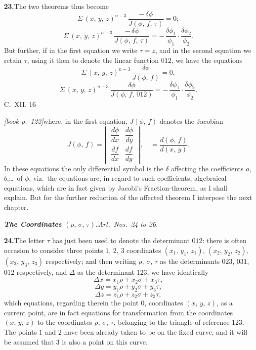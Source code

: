 \documentclass[11pt,a4paper]{article}
\theoremstyle{plain}
\theoremstyle{definition}
\theoremstyle{remark}
\begin{document}
\medskip\noindent\textbf{23.}\quad The two theorems thus become
\[
\Sigma\,(x,\,y,\,z)^{n-3}\,\frac{-\,\delta\phi}{J(\phi,\,f,\,\tau)} = 0;
\]
\[
\Sigma\,(x,\,y,\,z)^{n-3}\,\frac{-\,\delta\phi}{J(\phi,\,f,\,\tau)} = -\,\frac{\delta\phi_1}{\phi_1}\cdot\frac{\delta\phi_2}{\phi_2}.
\]
But further, if in the first equation we write $\tau = z$, and in the second equation we retain $\tau$, using it then to denote the linear function $012$, we have the equations
\[
\Sigma\,(x,\,y,\,z)^{n-3}\,\frac{\delta\phi}{J(\phi,\,f)} = 0,
\]
\[
\Sigma\,(x,\,y,\,z)^{n-3}\,\frac{\delta\phi}{J(\phi,\,f,\,012)} = -\,\frac{\delta\phi_1}{\phi_1}\cdot\frac{\delta\phi_2}{\phi_2}.
\]
C.\ XII. \hfill 16

\noindent\textit{[book p.~122]}\quad where, in the first equation, $J(\phi,\,f)$ denotes the Jacobian
\[
J(\phi,\,f) = \left|\;
\begin{array}{cc}
\dfrac{d\phi}{dx} & \dfrac{d\phi}{dy}\\[4pt]
\dfrac{df}{dx}    & \dfrac{df}{dy}
\end{array}\;\right|,\quad = \frac{d(\phi,\,f)}{d(x,\,y)}.
\]
In these equations the only differential symbol is the $\delta$ affecting the coefficients $a$, $b$,\ldots\ of $\phi$, viz.\ the equations are, in regard to such coefficients, algebraical equations, which are in fact given by Jacobi's Fraction-theorem, as I shall explain. But for the further reduction of the affected theorem I interpose the next chapter.

\medskip\noindent\textit{\textbf{The Coordinates $(\rho,\,\sigma,\,\tau)$.}\quad Art.\ Nos.\ 24 to 26.}

\medskip\noindent\textbf{24.}\quad The letter $\tau$ has just been used to denote the determinant $012$: there is often occasion to consider three points $1$, $2$, $3$ coordinates $(x_1,\,y_1,\,z_1)$, $(x_2,\,y_2,\,z_2)$, $(x_3,\,y_3,\,z_3)$ respectively; and then writing $\rho$, $\sigma$, $\tau$ as the determinants $023$, $031$, $012$ respectively, and $\Delta$ as the determinant $123$, we have identically
\[
\Delta x = x_1\rho + x_2\sigma + x_3\tau,
\]
\[
\Delta y = y_1\rho + y_2\sigma + y_3\tau,
\]
\[
\Delta z = z_1\rho + z_2\sigma + z_3\tau,
\]
which equations, regarding therein the point $0$, coordinates $(x,\,y,\,z)$, as a current point, are in fact equations for transformation from the coordinates $(x,\,y,\,z)$ to the coordinates $\rho$, $\sigma$, $\tau$, belonging to the triangle of reference $123$. The points $1$ and $2$ have been already taken to be on the fixed curve, and it will be assumed that $3$ is also a point on this curve.
\end{document}
